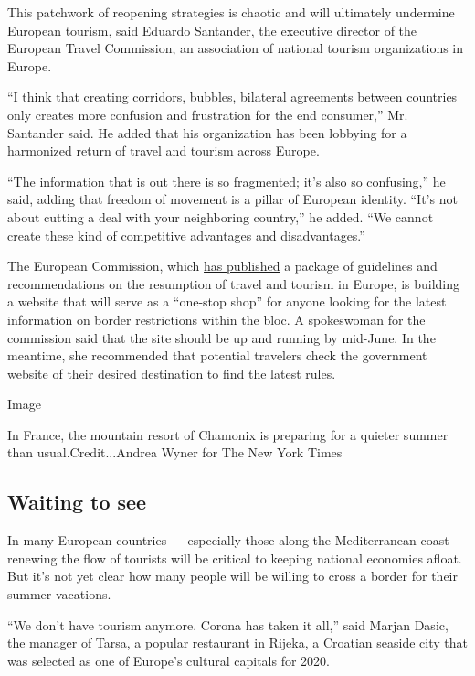This patchwork of reopening strategies is chaotic and will ultimately
undermine European tourism, said Eduardo Santander, the executive
director of the European Travel Commission, an association of national
tourism organizations in Europe.

``I think that creating corridors, bubbles, bilateral agreements between
countries only creates more confusion and frustration for the end
consumer,'' Mr. Santander said. He added that his organization has been
lobbying for a harmonized return of travel and tourism across Europe.

``The information that is out there is so fragmented; it's also so
confusing,'' he said, adding that freedom of movement is a pillar of
European identity. ``It's not about cutting a deal with your neighboring
country,'' he added. ``We cannot create these kind of competitive
advantages and disadvantages.''

The European Commission, which
\href{https://ec.europa.eu/commission/presscorner/detail/en/ip_20_854}{has
published} a package of guidelines and recommendations on the resumption
of travel and tourism in Europe, is building a website that will serve
as a ``one-stop shop'' for anyone looking for the latest information on
border restrictions within the bloc. A spokeswoman for the commission
said that the site should be up and running by mid-June. In the
meantime, she recommended that potential travelers check the government
website of their desired destination to find the latest rules.

Image

In France, the mountain resort of Chamonix is preparing for a quieter
summer than usual.Credit...Andrea Wyner for The New York Times

\hypertarget{waiting-to-see}{%
\subsection{Waiting to see}\label{waiting-to-see}}

In many European countries --- especially those along the Mediterranean
coast --- renewing the flow of tourists will be critical to keeping
national economies afloat. But it's not yet clear how many people will
be willing to cross a border for their summer vacations.

``We don't have tourism anymore. Corona has taken it all,'' said Marjan
Dasic, the manager of Tarsa, a popular restaurant in Rijeka, a
\href{https://www.nytimes3xbfgragh.onion/2019/10/24/travel/what-to-do-36-hours-in-rijeka-croatia.html}{Croatian
seaside city} that was selected as one of Europe's cultural capitals for
2020.

